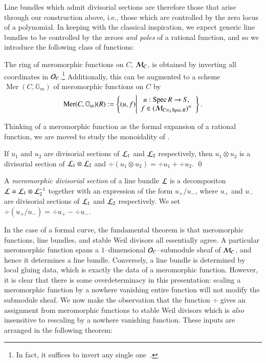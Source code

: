 Line bundles which admit divisorial sections are therefore those that arise through our construction above, i.e., those which are controlled by the zero locus of a polynomial.  In keeping with the classical inspiration, we expect generic line bundles to be controlled by the zeroes \emph{and poles} of a rational function, and so we introduce the following class of functions:

\begin{definition}
The ring of meromorphic functions on $C$, $\mathcal{M}_C$, is obtained by inverting all coordinates in $\mathcal{O}_C$.\footnote{In fact, it suffices to invert any single one~\cite[Lemma 5.21]{StricklandFSFG}.}  Additionally, this can be augmented to a scheme $\operatorname{Mer}(C, \mathbb G_m)$ of meromorphic functions on $C$ by \[\operatorname{Mer}(C, \mathbb G_m)(R) := \left\{ (u, f) \middle| \begin{array}{c} u: \operatorname{Spec} R \to S, \\ f \in (\mathcal{M}_{C \times_S \operatorname{Spec} R})^\times \end{array} \right\}.\]
\end{definition}

Thinking of a meromorphic function as the formal expansion of a rational function, we are moved to study the monoidality of .

\begin{lemma}
If $u_1$ and $u_2$ are divisorial sections of $\mathcal{L}_1$ and $\mathcal{L}_2$ respectively, then $u_1 \otimes u_2$ is a divisorial section of $\mathcal{L}_1 \otimes \mathcal{L}_2$ and $\div(u_1 \otimes u_2) = \div u_1 + \div u_2$. \qed
\end{lemma}

\begin{definition}
A \textit{meromorphic divisorial section} of a line bundle $\mathcal{L}$ is a decompositon $\mathcal{L} \cong \mathcal{L}_1 \otimes \mathcal{L}_2^{-1}$ together with an expression of the form $u_+ / u_-$, where $u_+$ and $u_-$ are divisorial sections of $\mathcal{L}_1$ and $\mathcal{L}_2$ respectively.  We set $\div(u_+ / u_-) = \div u_+ - \div u_-$.
\end{definition}

In the case of a formal curve, the fundamental theorem is that meromorphic functions, line bundles, and stable Weil divisors all essentially agree.  A particular meromorphic function spans a $1$--dimensional $\mathcal{O}_C$--submodule sheaf of $\mathcal{M}_C$, and hence it determines a line bundle.  Conversely, a line bundle is determined by local gluing data, which is exactly the data of a meromorphic function.  However, it is clear that there is some overdeterminacy in this presentation: scaling a meromorphic function by a nowhere vanishing entire function will not modify the submodule sheaf.  We now make the observation that the function $\div$ gives an assignment from meromorphic functions to stable Weil divisors which is \emph{also} insensitive to rescaling by a nowhere vanishing function.  These inputs are arranged in the following theorem:

